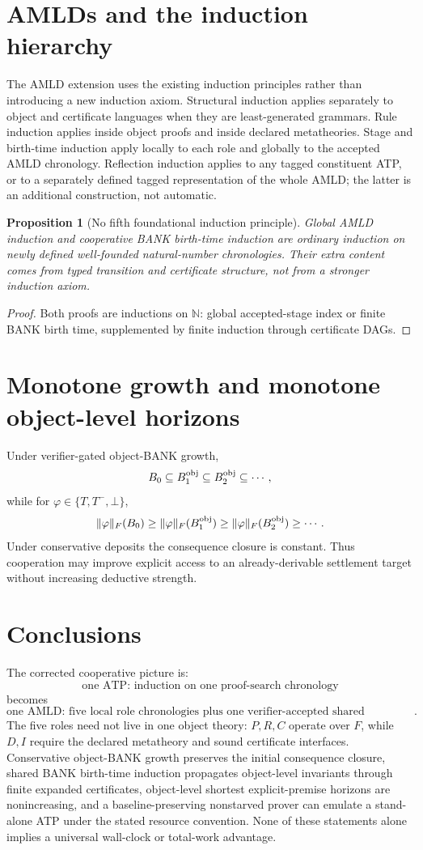 \documentclass[11pt]{article}
\newtheorem{proposition}[definition]{Proposition}
\theoremstyle{remark}
\begin{document}
\section{AMLDs and the induction hierarchy}
The AMLD extension uses the existing induction principles rather than introducing a new induction axiom. Structural induction applies separately to object and certificate languages when they are least-generated grammars. Rule induction applies inside object proofs and inside declared metatheories. Stage and birth-time induction apply locally to each role and globally to the accepted AMLD chronology. Reflection induction applies to any tagged constituent ATP, or to a separately defined tagged representation of the whole AMLD; the latter is an additional construction, not automatic.

\begin{proposition}[No fifth foundational induction principle]
Global AMLD induction and cooperative BANK birth-time induction are ordinary induction on newly defined well-founded natural-number chronologies. Their extra content comes from typed transition and certificate structure, not from a stronger induction axiom.
\end{proposition}
\begin{proof}
Both proofs are inductions on $\mathbb N$: global accepted-stage index or finite BANK birth time, supplemented by finite induction through certificate DAGs.
\end{proof}

\section{Monotone growth and monotone object-level horizons}
Under verifier-gated object-BANK growth,
\[
B_0\subseteq B_1^{\rm obj}\subseteq B_2^{\rm obj}\subseteq\cdots,
\]
while for $\varphi\in\{T,T^-,\bot\}$,
\[
\|\varphi\|_F(B_0)\ge\|\varphi\|_F(B_1^{\rm obj})\ge\|\varphi\|_F(B_2^{\rm obj})\ge\cdots.
\]
Under conservative deposits the consequence closure is constant. Thus cooperation may improve explicit access to an already-derivable settlement target without increasing deductive strength.

\section{Conclusions}
The corrected cooperative picture is:
\[
\boxed{\text{one ATP: induction on one proof-search chronology}}
\]
becomes
\[
\boxed{\text{one AMLD: five local role chronologies plus one verifier-accepted shared chronology}.}
\]
The five roles need not live in one object theory: $P,R,C$ operate over $F$, while $D,I$ require the declared metatheory and sound certificate interfaces. Conservative object-BANK growth preserves the initial consequence closure, shared BANK birth-time induction propagates object-level invariants through finite expanded certificates, object-level shortest explicit-premise horizons are nonincreasing, and a baseline-preserving nonstarved prover can emulate a stand-alone ATP under the stated resource convention. None of these statements alone implies a universal wall-clock or total-work advantage.
\end{document}
